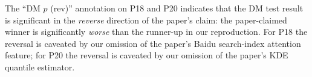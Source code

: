 \noindent The ``DM $p$ (rev)'' annotation on P18 and P20 indicates that the DM test result is significant in the \emph{reverse} direction of the paper's claim: the paper-claimed winner is significantly \emph{worse} than the runner-up in our reproduction. For P18 the reversal is caveated by our omission of the paper's Baidu search-index attention feature; for P20 the reversal is caveated by our omission of the paper's KDE quantile estimator.
